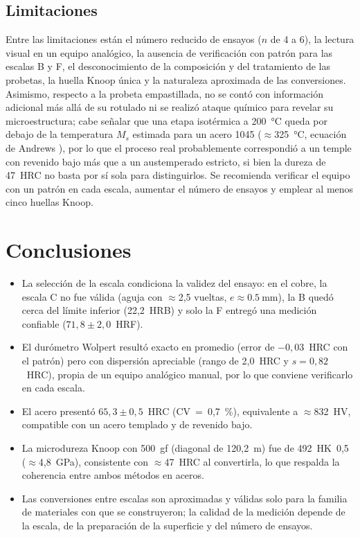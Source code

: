 \documentclass[journal,11pt]{IEEEtran}
\begin{document}
\subsection{Limitaciones}
Entre las limitaciones están el número reducido de ensayos ($n$ de 4 a 6), la lectura visual en un equipo analógico, la ausencia de verificación con patrón para las escalas B y F, el desconocimiento de la composición y del tratamiento de las probetas, la huella Knoop única y la naturaleza aproximada de las conversiones. Asimismo, respecto a la probeta empastillada, no se contó con información adicional más allá de su rotulado ni se realizó ataque químico para revelar su microestructura; cabe señalar que una etapa isotérmica a 200~\si{\degreeCelsius} queda por debajo de la temperatura $M_s$ estimada para un acero 1045 ($\approx$325~\si{\degreeCelsius}, ecuación de Andrews \cite{andrews}), por lo que el proceso real probablemente correspondió a un temple con revenido bajo más que a un austemperado estricto, si bien la dureza de 47~HRC no basta por sí sola para distinguirlos. Se recomienda verificar el equipo con un patrón en cada escala, aumentar el número de ensayos y emplear al menos cinco huellas Knoop.

\section{Conclusiones}
\begin{itemize}
\item La selección de la escala condiciona la validez del ensayo: en el cobre, la escala C no fue válida (aguja con $\approx$2,5 vueltas, $e\approx\SI{0,5}{\milli\metre}$), la B quedó cerca del límite inferior (22,2~HRB) y solo la F entregó una medición confiable ($71{,}8\pm2{,}0$~HRF).
\item El durómetro Wolpert resultó exacto en promedio (error de $-0{,}03$~HRC con el patrón) pero con dispersión apreciable (rango de 2,0~HRC y $s=0{,}82$~HRC), propia de un equipo analógico manual, por lo que conviene verificarlo en cada escala.
\item El acero presentó $65{,}3\pm0{,}5$~HRC (CV~=~0,7~\%), equivalente a $\approx$832~HV, compatible con un acero templado y de revenido bajo.
\item La microdureza Knoop con 500~gf (diagonal de 120,2~\textmu m) fue de 492~HK~0,5 ($\approx$4,8~GPa), consistente con $\approx$47~HRC al convertirla, lo que respalda la coherencia entre ambos métodos en aceros.
\item Las conversiones entre escalas son aproximadas y válidas solo para la familia de materiales con que se construyeron; la calidad de la medición depende de la escala, de la preparación de la superficie y del número de ensayos.
\end{itemize}
\end{document}
